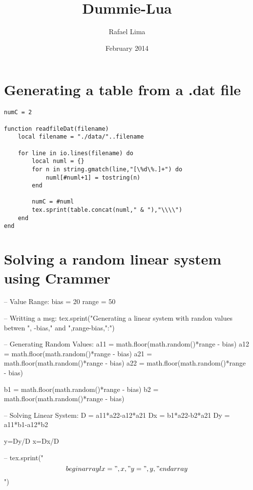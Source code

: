 \documentclass{article}
\title{Dummie-Lua}
\author{Rafael Lima}
\date{February 2014}
\begin{document}

\maketitle

\section{Generating a table from a .dat file}
\begin{verbatim}
numC = 2
 
function readfileDat(filename)
    local filename = "./data/"..filename
 
    for line in io.lines(filename) do
        local numl = {}
        for n in string.gmatch(line,"[\%d\%.]+") do
            numl[#numl+1] = tostring(n)
        end

        numC = #numl
        tex.sprint(table.concat(numl," & "),"\\\\")
    end
end
\end{verbatim}



\section{Solving a random linear system using Crammer}

\newcommand{\printLua}[1]{\directlua{tex.print(#1)}}

\begin{luacode}
-- Value Range:
bias = 20
range = 50 

-- Writting a msg:
tex.sprint("Generating a linear system with randon values betwen ",
   -bias," and ",range-bias,":")

-- Generating Random Values:
a11 = math.floor(math.random()*range - bias)
a12 = math.floor(math.random()*range - bias)
a21 = math.floor(math.random()*range - bias)
a22 = math.floor(math.random()*range - bias)

b1 = math.floor(math.random()*range - bias)
b2 = math.floor(math.random()*range - bias)

-- Solving Linear System:
D = a11*a22-a12*a21
Dx = b1*a22-b2*a21
Dy = a11*b1-a12*b2

y=Dy/D
x=Dx/D

-- tex.sprint("$$\\begin{array}{l}x = ",x,"\\\\y = ",y,"\\end{array}$$")
\end{luacode}
\end{document}
